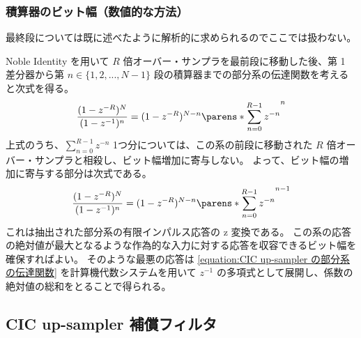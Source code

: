         \subsubsection{積算器のビット幅（数値的な方法）}
            最終段については既に述べたように解析的に求められるのでここでは扱わない。
            \par
            Noble Identity を用いて $R$ 倍オーバー・サンプラを最前段に移動した後、第 1 差分器から第 $n\in\{1,2,...,N-1\}$ 段の積算器までの部分系の伝達関数を考えると次式を得る。
            \[ \frac{(1-z^{-R})^N}{(1-z^{-1})^n} = (1-z^{-R})^{N-n}\parens*{\sum_{n=0}^{R-1} z^{-n}}^n \]
            上式のうち、$\sum_{n=0}^{R-1} z^{-n}$ 1つ分については、この系の前段に移動された $R$ 倍オーバー・サンプラと相殺し、ビット幅増加に寄与しない。
            よって、ビット幅の増加に寄与する部分は次式である。
            \begin{equation}
                \frac{(1-z^{-R})^N}{(1-z^{-1})^n} = (1-z^{-R})^{N-n}\parens*{\sum_{n=0}^{R-1} z^{-n}}^{n-1} \label{equation:CIC up-sampler の部分系の伝達関数}
            \end{equation}
            これは抽出された部分系の有限インパルス応答の z 変換である。
            この系の応答の絶対値が最大となるような作為的な入力に対する応答を収容できるビット幅を確保すればよい。
            そのような最悪の応答は \cref{equation:CIC up-sampler の部分系の伝達関数} を計算機代数システムを用いて $z^{-1}$ の多項式として展開し、係数の絶対値の総和をとることで得られる。
    \subsection{CIC up-sampler 補償フィルタ}
        \newcommand{\HCNF}{H_\text{C,NF}}

